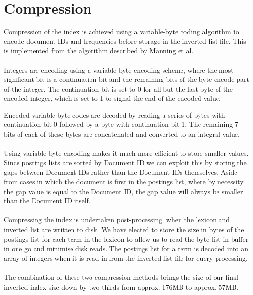 
\section{Compression}
\label{sec:compression}

Compression of the index is achieved using a variable-byte coding algorithm to encode document IDs and frequencies before storage in the inverted list file. This is implemented from the algorithm described by Manning et al.\,\cite[p. 96-98]{manning2008introduction}

\paragraph{}
Integers are encoding using a variable byte encoding scheme, where the most significant bit is a continuation bit and the remaining bits of the byte encode part of the integer. The continuation bit is set to 0 for all but the last byte of the encoded integer, which is set to 1 to signal the end of the encoded value.

Encoded variable byte codes are decoded by reading a series of bytes with continuation bit 0 followed by a byte with continuation bit 1. The remaining 7 bits of each of these bytes are concatenated and converted to an integral value.

\paragraph{}
Using variable byte encoding makes it much more efficient to store smaller values. Since postings lists are sorted by Document ID we can exploit this by storing the gaps between Document IDs rather than the Document IDs themselves. Aside from cases in which the document is first in the postings list, where by necessity the gap value is equal to the Document ID, the gap value will always be smaller than the Document ID itself.

\paragraph{}
Compressing the index is undertaken post-processing, when the lexicon and inverted list are written to disk. We have elected to store the size in bytes of the postings list for each term in the lexicon to allow us to read the byte list in buffer in one go and minimise disk reads. The postings list for a term is decoded into an array of integers when it is read in from the inverted list file for query processing.

\paragraph{}
The combination of these two compression methods brings the size of our final inverted index size down by two thirds from approx. 176MB to approx. 57MB.
